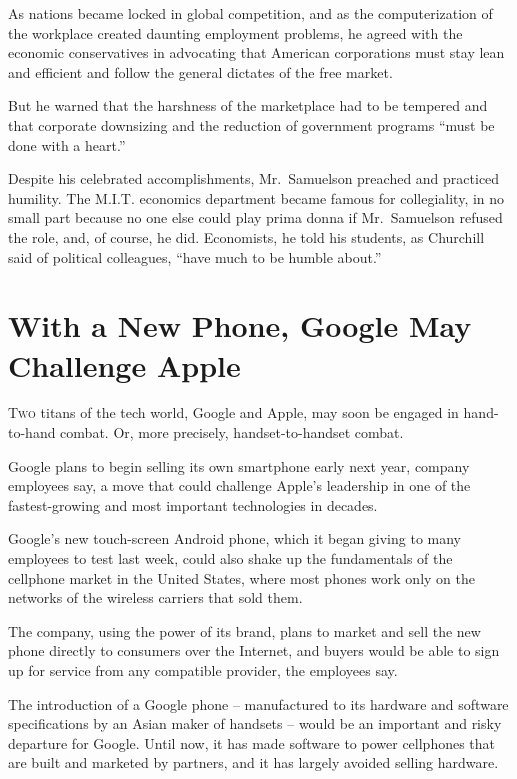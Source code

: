 ﻿\documentclass[12pt]{article}
\begin{document}
As nations became locked in global competition, and as the computerization of the workplace created
daunting employment problems, he agreed with the economic conservatives in advocating that American
corporations must stay lean and efficient and follow the general dictates of the free market.

But he warned that the harshness of the marketplace had to be tempered and that corporate downsizing
and the reduction of government programs ``must be done with a heart.''

Despite his celebrated accomplishments, Mr.~Samuelson preached and practiced humility. The M.I.T.
economics department became famous for collegiality, in no small part because no one else could play
prima donna if Mr.~Samuelson refused the role, and, of course, he did. Economists, he told his
students, as Churchill said of political colleagues, ``have much to be humble about.''

\section{With a New Phone, Google May Challenge Apple}

\lettrine{T}{wo} titans of the tech world, Google and Apple, may soon be
engaged in hand-to-hand combat. Or, more precisely, handset-to-handset combat.

Google plans to begin selling its own smartphone early next year, company employees say, a move that
could challenge Apple's leadership in one of the fastest-growing and most important technologies in
decades.

Google's new touch-screen Android phone, which it began giving to many employees to test last week,
could also shake up the fundamentals of the cellphone market in the United States, where most phones
work only on the networks of the wireless carriers that sold them.

The company, using the power of its brand, plans to market and sell the new phone directly to
consumers over the Internet, and buyers would be able to sign up for service from any compatible
provider, the employees say.

The introduction of a Google phone -- manufactured to its hardware and software specifications by an
Asian maker of handsets -- would be an important and risky departure for Google. Until now, it has
made software to power cellphones that are built and marketed by partners, and it has largely
avoided selling hardware.
\end{document}
